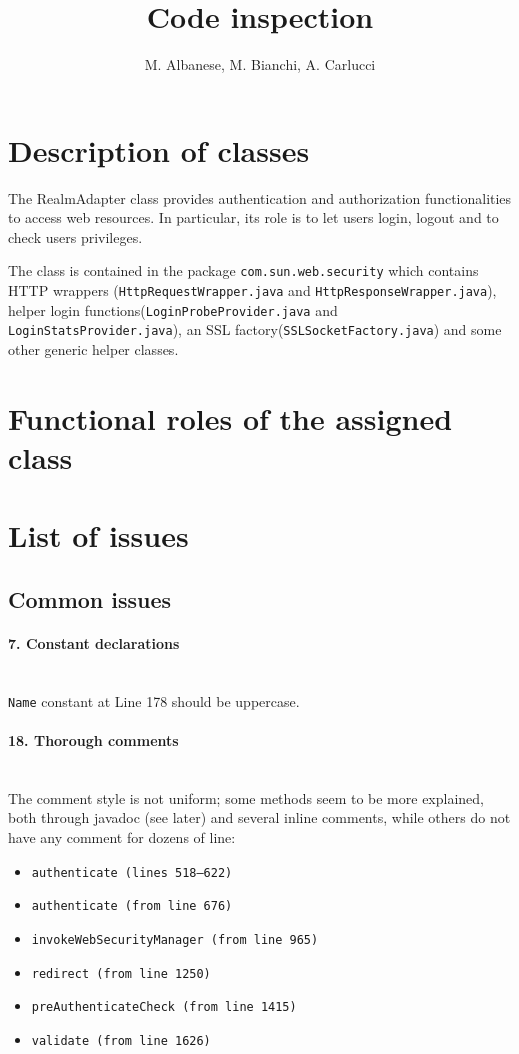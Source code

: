 \documentclass[english]{article}
\newcommand{\code}[1]{\texttt{#1}}
\newcommand{\issue}[3][?]{
    \paragraph{#1. #2} \mbox{}\\ #3
}
\begin{document}
\title{Code inspection}


\author{M. Albanese, M. Bianchi, A. Carlucci}

\maketitle
\tableofcontents{}

\newpage{}


\section{Description of classes}

The RealmAdapter class provides authentication and authorization functionalities
to access web resources. In particular, its role is to let users login,
logout and to check users privileges.

The class is contained in the package \code{com.sun.web.security} which contains
HTTP wrappers (\code{HttpRequestWrapper.java} and \code{HttpResponseWrapper.java}), 
helper login functions(\code{LoginProbeProvider.java} and \code{LoginStatsProvider.java}), 
an SSL factory(\code{SSLSocketFactory.java}) and some other generic helper classes.

\section{Functional roles of the assigned class}

\section{List of issues}
\subsection{Common issues} %
\issue[7]{Constant declarations}{
    \code{Name} constant at Line 178 should be uppercase.
}

\issue[18]{Thorough comments} {
The comment style is not uniform; some methods seem to be more explained, 
both through javadoc (see later) and several inline comments, while others 
do not have any comment for dozens of line:
\begin{itemize}
\item \code{authenticate (lines 518--622)} 
\item \code{authenticate (from line 676)} 
\item \code{invokeWebSecurityManager (from line 965)} 
\item \code{redirect (from line 1250)} 
\item \code{preAuthenticateCheck (from line 1415)} 
\item \code{validate (from line 1626)} 
\end{itemize}
}
\end{document}

